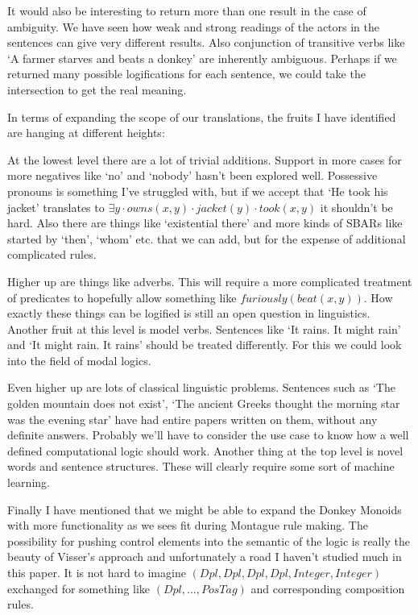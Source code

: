 \documentclass[12pt]{article}
\begin{document}
It would also be interesting to return more than one result in the case of ambiguity. We have seen how weak and strong readings of the actors in the sentences can give very different results. Also conjunction of transitive verbs like `A farmer starves and beats a donkey' are inherently ambiguous. Perhaps if we returned many possible logifications for each sentence, we could take the intersection to get the real meaning.

In terms of expanding the scope of our translations, the fruits I have identified are hanging at different heights:

At the lowest level there are a lot of trivial additions. Support in more cases for more negatives like `no' and `nobody' hasn't been explored well. Possessive pronouns is something I've struggled with, but if we accept that `He took his jacket' translates to $\exists y\cdot owns(x,y)\cdot jacket(y)\cdot took(x,y)$ it shouldn't be hard. Also there are things like `existential there' and more kinds of SBARs like started by `then', `whom' etc. that we can add, but for the expense of additional complicated rules.

Higher up are things like adverbs. This will require a more complicated treatment of predicates to hopefully allow something like $furiously(beat(x,y))$. How exactly these things can be logified is still an open question in linguistics. Another fruit at this level is model verbs. Sentences like `It rains. It might rain' and `It might rain. It rains' should be treated differently. For this we could look into the field of modal logics.

Even higher up are lots of classical linguistic problems. Sentences such as `The golden mountain does not exist', `The ancient Greeks thought the morning star was the evening star' have had entire papers written on them, without any definite answers. Probably we'll have to consider the use case to know how a well defined computational logic should work. Another thing at the top level is novel words and sentence structures. These will clearly require some sort of machine learning.

Finally I have mentioned that we might be able to expand the Donkey Monoids with more functionality as we sees fit during Montague rule making. The possibility for pushing control elements into the semantic of the logic is really the beauty of Visser's approach and unfortunately a road I haven't studied much in this paper. It is not hard to imagine $(Dpl,Dpl,Dpl,Dpl,Integer,Integer)$ exchanged for something like $(Dpl,\dots,PosTag)$ and corresponding composition rules.
\end{document}
